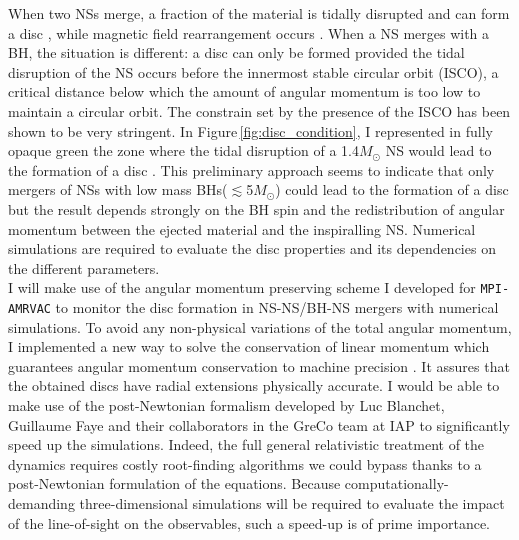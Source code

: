\documentclass[11pt,onecolumn]{article}
\makeatletter
\newcommand*{\ns}{NS\@\xspace}
\newcommand*{\nss}{NSs\@\xspace}
\newcommand*{\bh}{BH\@\xspace}
\newcommand*{\bhs}{BHs\@\xspace}
\newcommand*{\msun}{$M_{\odot}$\@\xspace}
\makeatother
\begin{document}
When two \nss merge, a fraction of the material is tidally disrupted and can form a disc \citep{Baiotti2017}, while magnetic field rearrangement occurs \citep{Crinquand2018}. When a \ns merges with a \bh, the situation is different: a disc can only be formed provided the tidal disruption of the \ns occurs before the innermost stable circular orbit (ISCO), a critical distance below which the amount of angular momentum is too low to maintain a circular orbit. The constrain set by the presence of the ISCO has been shown to be very stringent. In Figure\,\ref{fig:disc_condition}, I represented in fully opaque green the zone where the tidal disruption of a 1.4\msun \ns would lead to the formation of a disc \citep[based on arguments inspired from][]{Foucart2012}. This preliminary approach seems to indicate that only mergers of \nss with low mass \bhs ($\lesssim$5\msun) could lead to the formation of a disc but the result depends strongly on the \bh spin and the redistribution of angular momentum between the ejected material and the inspiralling \ns. Numerical simulations are required to evaluate the disc properties and its dependencies on the different parameters.\\

I will make use of the angular momentum preserving scheme I developed for \texttt{MPI-AMRVAC} to monitor the disc formation in \ns-\ns/\bh-\ns mergers with numerical simulations. To avoid any non-physical variations of the total angular momentum, I implemented a new way to solve the conservation of linear momentum which guarantees angular momentum conservation to machine precision \citep{ElMellah2019}. It assures that the obtained discs have radial extensions physically accurate. I would be able to make use of the post-Newtonian formalism developed by Luc Blanchet, Guillaume Faye and their collaborators in the GreCo team at IAP to significantly speed up the simulations. Indeed, the full general relativistic treatment of the dynamics requires costly root-finding algorithms we could bypass thanks to a post-Newtonian formulation of the equations. Because computationally-demanding three-dimensional simulations will be required to evaluate the impact of the line-of-sight on the observables, such a speed-up is of prime importance.\\
\end{document}
